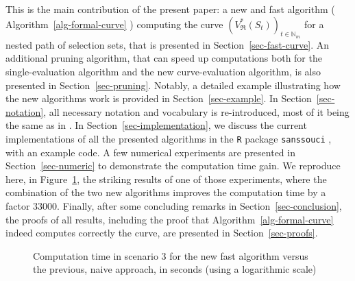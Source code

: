 \documentclass[
  11pt,
  a4paper,
]{article}
\theoremstyle{plain}
\theoremstyle{definition}
\theoremstyle{plain}
\theoremstyle{definition}
\theoremstyle{plain}
\theoremstyle{remark}
\begin{document}
This is the main contribution of the present paper: a new and fast
algorithm ( Algorithm~\ref{alg-formal-curve} ) computing the curve
\(\left(V^*_{\mathfrak{R}}(S_t)\right)_{t\in\mathbb{N}_m}\) for a nested
path of selection sets, that is presented in
Section~\ref{sec-fast-curve}. An additional pruning algorithm, that can
speed up computations both for the single-evaluation algorithm and the
new curve-evaluation algorithm, is also presented in
Section~\ref{sec-pruning}. Notably, a detailed example illustrating how
the new algorithms work is provided in Section~\ref{sec-example}. In
Section~\ref{sec-notation}, all necessary notation and vocabulary is
re-introduced, most of it being the same as in \citet{MR4178188}. In
Section~\ref{sec-implementation}, we discuss the current implementations
of all the presented algorithms in the \texttt{R} \citep{R-base} package
\texttt{sanssouci} \citep{sanssouci}, with an example code. A few
numerical experiments are presented in Section~\ref{sec-numeric} to
demonstrate the computation time gain. We reproduce here, in
Figure~\ref{fig-benchmark_intro}, the striking results of one of those
experiments, where the combination of the two new algorithms improves
the computation time by a factor \(33000\). Finally, after some
concluding remarks in Section~\ref{sec-conclusion}, the proofs of all
results, including the proof that  Algorithm~\ref{alg-formal-curve} 
indeed computes correctly the curve, are presented in
Section~\ref{sec-proofs}.

\begin{figure}


\caption{\label{fig-benchmark_intro}Computation time in scenario 3 for
the new fast algorithm versus the previous, naive approach, in seconds
(using a logarithmic scale)}

\end{figure}%
\end{document}
